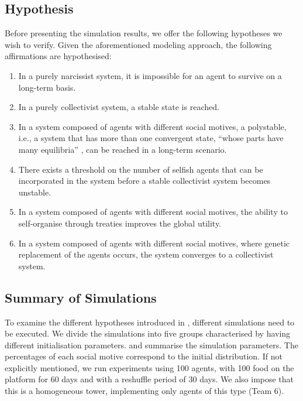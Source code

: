 \subsection{Hypothesis}\label{hypothesis}
Before presenting the simulation results, we offer the following hypotheses we wish to verify. Given the aforementioned modeling approach, the following affirmations are hypothesised:
\begin{enumerate}

    \item In a purely narcissist system, it is impossible for an agent to survive on a long-term basis.
    
    \item In a purely collectivist system, a stable state is reached.
    
    \item In a system composed of agents with different social motives, a polystable, i.e., a system that has more than one convergent state, ``whose parts have many equilibria'' \cite{ashby2015design}, can be reached in a long-term scenario.
        
    \item There exists a threshold on the number of selfish agents that can be incorporated in the system before a stable collectivist system becomes unstable.
     
    \item In a system composed of agents with different social motives, the ability to self-organise through treaties improves the global utility.
    
    \item In a system composed of agents with different social motives, where genetic replacement of the agents occurs, the system converges to a collectivist system.
   
   
\end{enumerate}

\subsection{Summary of Simulations}\label{simulation_summary}

To examine the different hypotheses introduced in , different simulations need to be executed. We divide the simulations into five groups characterised by having different initialisation parameters.  and  summarise the simulation parameters. The percentages of each social motive correspond to the initial distribution. If not explicitly mentioned, we run experiments using 100 agents, with 100 food on the platform for 60 days and with a reshuffle period of 30 days. We also impose that this is a homogeneous tower, implementing only agents of this type (Team 6).

